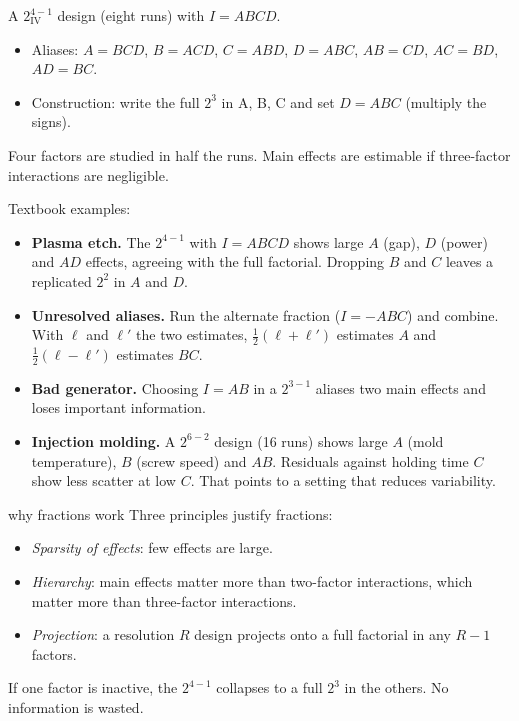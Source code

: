 \begin{example}
A $2^{4-1}_{\mathrm{IV}}$ design (eight runs) with $I=ABCD$.
\begin{itemize}
  \item Aliases: $A=BCD$, $B=ACD$, $C=ABD$, $D=ABC$, $AB=CD$, $AC=BD$, $AD=BC$.
  \item Construction: write the full $2^3$ in A, B, C and set $D=ABC$ (multiply the signs).
  \end{itemize}
Four factors are studied in half the runs. Main effects are estimable if three-factor interactions are negligible.
\end{example}

Textbook examples:
\begin{itemize}
  \item \textbf{Plasma etch.} The $2^{4-1}$ with $I=ABCD$ shows large $A$ (gap), $D$ (power) and $AD$ effects, agreeing with the full factorial. Dropping $B$ and $C$ leaves a replicated $2^2$ in $A$ and $D$.
  \item \textbf{Unresolved aliases.} Run the alternate fraction ($I=-ABC$) and combine. With $\ell$ and $\ell'$ the two estimates, $\tfrac12(\ell+\ell')$ estimates $A$ and $\tfrac12(\ell-\ell')$ estimates $BC$.
  \item \textbf{Bad generator.} Choosing $I=AB$ in a $2^{3-1}$ aliases two main effects and loses important information.
  \item \textbf{Injection molding.} A $2^{6-2}$ design (16 runs) shows large $A$ (mold temperature), $B$ (screw speed) and $AB$. Residuals against holding time $C$ show less scatter at low $C$. That points to a setting that reduces variability.
\end{itemize}

\begin{interview}{why fractions work}
Three principles justify fractions:
\begin{itemize}
  \item \emph{Sparsity of effects}: few effects are large.
  \item \emph{Hierarchy}: main effects matter more than two-factor interactions, which matter more than three-factor interactions.
  \item \emph{Projection}: a resolution $R$ design projects onto a full factorial in any $R-1$ factors.
\end{itemize}
If one factor is inactive, the $2^{4-1}$ collapses to a full $2^3$ in the others. No information is wasted.
\end{interview}

